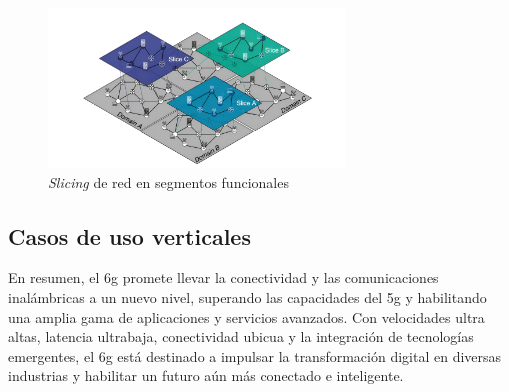 \begin{figure}[h!]
    \centering
    \includegraphics[width=0.7\textwidth]{archivos/img/teoria/flex.jpg}
    \caption{\textit{Slicing} de red en segmentos funcionales \cite{qin20236g}}
    \label{fig:flex}
\end{figure}



\subsection{Casos de uso verticales}



En resumen, el \gls{6g} promete llevar la conectividad y las comunicaciones inalámbricas a un nuevo nivel, superando las capacidades del \gls{5g} y habilitando una amplia gama de aplicaciones y servicios avanzados. Con velocidades ultra altas, latencia ultrabaja, conectividad ubicua y la integración de tecnologías emergentes, el \gls{6g} está destinado a impulsar la transformación digital en diversas industrias y habilitar un futuro aún más conectado e inteligente.

